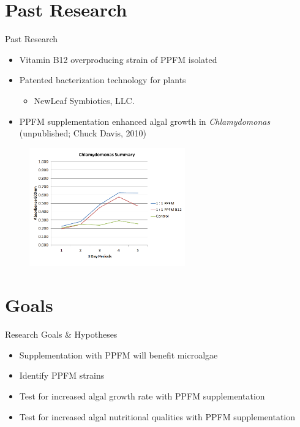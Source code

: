 \documentclass[8pt]{beamer}\usepackage[]{graphicx}\usepackage[]{color}
\begin{document}
\section{Past Research}
\begin{frame}{Past Research}
\begin{itemize}
\item Vitamin B12 overproducing strain of PPFM isolated
\item Patented bacterization technology for plants
  \begin{itemize}
  \item NewLeaf Symbiotics, LLC.
  \end{itemize}
\item PPFM supplementation enhanced algal growth in {\it Chlamydomonas} (unpublished; Chuck Davis, 2010)
\end{itemize}

\begin{figure}
    \centering
    \includegraphics[width=0.6\textwidth]{./figure/Chlamydomonas_summary}
    \label{}
\end{figure}
\end{frame}
\section{Goals}
\begin{frame}{Research Goals \& Hypotheses}
\begin{itemize}
\item Supplementation with PPFM will benefit microalgae 
\end{itemize}
\begin{itemize}
  \item Identify PPFM strains
  \item Test for increased algal growth rate with PPFM supplementation
  \item Test for increased algal nutritional qualities with PPFM supplementation
\end{itemize}


\end{frame}
\end{document}
